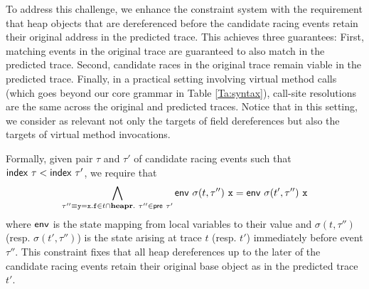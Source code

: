 To address this challenge, we enhance the constraint system with the requirement that heap objects that are dereferenced before the candidate racing events retain their original address in the predicted trace.
This achieves three guarantees: First, matching events in the original trace are guaranteed to also match in the predicted trace. Second, candidate races in the original trace remain viable in the predicted trace. Finally, in a practical setting involving virtual method calls (which goes beyond our core grammar in Table \ref{Ta:syntax}), call-site resolutions are the same across the original and predicted traces. Notice that in this setting, we consider as relevant not only the targets of field dereferences but also the targets of virtual method invocations.

Formally, given pair $\tau$ and $\tau'$ of candidate racing events such that ${\sf index}\ \tau < {\sf index}\ \tau'$, 
we require that
$$
\bigwedge_{\tau'' \equiv {\tt y=x.f} \in t \cap {\bf heapr}.\
	\tau'' \in {\sf pre}\ \tau'} {\sf env}\ \sigma(t,\tau'')\ {\tt x} = {\sf env}\ \sigma(t',\tau'')\ {\tt x}
$$
where ${\sf env}$ is the state mapping from local variables to their value and $\sigma(t,\tau'')$ 
(resp. $\sigma(t',\tau'')$) is the state arising at trace $t$ (resp. $t'$) immediately before event $\tau''$.
This constraint fixes that all heap dereferences up to the later of the candidate racing events retain their original base object as in the predicted trace $t'$. 
